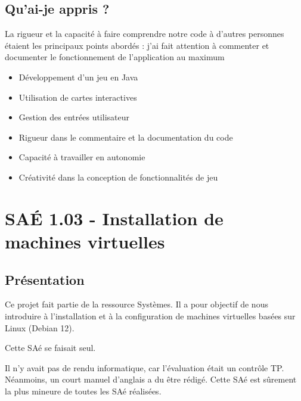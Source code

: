 \documentclass{mytex}
\begin{document}



\subsection{Qu'ai-je appris ?}

La rigueur et la capacité à faire comprendre notre code à d'autres personnes étaient les principaux points abordés : j'ai fait attention à commenter et documenter le fonctionnement de l'application au maximum

\begin{itemize}
	\item Développement d'un jeu en Java
	\item Utilisation de cartes interactives
	\item Gestion des entrées utilisateur
\end{itemize}

\begin{itemize}
	\item Rigueur dans le commentaire et la documentation du code
	\item Capacité à travailler en autonomie
	\item Créativité dans la conception de fonctionnalités de jeu
\end{itemize}

\section{SAÉ 1.03 - Installation de machines virtuelles}

\subsection{Présentation}

Ce projet fait partie de la ressource Systèmes. Il a pour objectif de nous introduire à l'installation et à la configuration de machines virtuelles basées sur Linux (Debian 12). 

Cette SAé se faisait seul. 

Il n'y avait pas de rendu informatique, car l'évaluation était un contrôle TP. Néanmoins, un court manuel d'anglais a du être rédigé. Cette SAé est sûrement la plus mineure de toutes les SAé réalisées.
\end{document}

